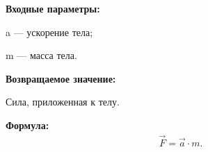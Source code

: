 \textbf{Входные параметры:}  
 
a --- ускорение тела;

 m --- масса тела.

\textbf{Возвращаемое значение:}

 Сила, приложенная к телу.
 
\textbf{Формула:}
\begin{eqnarray*}
\vec{F}=\vec{a}\cdot m.
\end{eqnarray*}